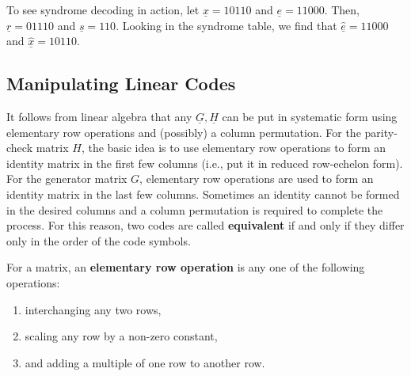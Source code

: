 \begin{example}
To see syndrome decoding in action, let $\underline{x}=10110$ and $\underline{e}=11000$.
Then, $\underline{r}=01110$ and $\underline{s}=110$.
Looking in the syndrome table, we find that $\underline{\hat{e}}=11000$ and $\underline{\hat{x}}=10110$.
\end{example}

\subsection{Manipulating Linear Codes}

It follows from linear algebra that any $\underline{G},\underline{H}$ can be put in systematic form using elementary row operations and (possibly) a column permutation.
For the parity-check matrix $H$, the basic idea is to use elementary row operations to form an identity matrix in the first few columns (i.e., put it in reduced row-echelon form).
For the generator matrix $G$, elementary row operations are used to form an identity matrix in the last few columns.
Sometimes an identity cannot be formed in the desired columns and a column permutation is required to complete the process.
For this reason, two codes are called \textbf{equivalent} if and only if they differ only in the order of the code symbols.

\begin{definition}
For a matrix, an \textbf{elementary row operation} is any one of the following operations:
\begin{enumerate}
\item interchanging any two rows,
\item scaling any row by a non-zero constant,
\item and adding a multiple of one row to another row.
\end{enumerate}
\end{definition}

